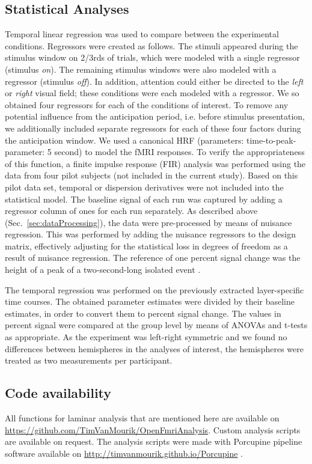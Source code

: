 \subsection{Statistical Analyses}
Temporal linear regression was used to compare between the experimental conditions. Regressors were created as follows. The stimuli appeared during the stimulus window on 2/3rds of trials, which were modeled with a single regressor (stimulus \emph{on}). The remaining stimulus windows were also modeled with a regressor (stimulus \emph{off}). In addition, attention could either be directed to the \emph{left} or \emph{right} visual field; these conditions were each modeled with a regressor. We so obtained four regressors for each of the conditions of interest. To remove any potential influence from the anticipation period, i.e. before stimulus presentation, we additionally included separate regressors for each of these four factors during the anticipation window. We used a canonical HRF (parameters: time-to-peak-parameter: 5 second) to model the fMRI responses. To verify the appropriateness of this function, a finite impulse response (FIR) analysis \cite{Josephs1997} was performed using the data from four pilot subjects (not included in the current study). Based on this pilot data set, temporal or dispersion derivatives were not included into the statistical model. The baseline signal of each run was captured by adding a regressor column of ones for each run separately. As described above (Sec.~\ref{sec:dataProcessing}), the data were pre-processed by means of nuisance regression. This was performed by adding the nuisance regressors to the design matrix, effectively adjusting for the statistical loss in degrees of freedom as a result of nuisance regression. The reference of one percent signal change was the height of a peak of a two-second-long isolated event \cite{Mumford2007}.

The temporal regression was performed on the previously extracted layer-specific time courses. The obtained parameter estimates were divided by their baseline estimates, in order to convert them to percent signal change. The values in percent signal were compared at the group level by means of ANOVAs and t-tests as appropriate. As the experiment was left-right symmetric and we found no differences between hemispheres in the analyses of interest, the hemispheres were treated as two measurements per participant.

\subsection{Code availability}
All functions for laminar analysis that are mentioned here are available on \url{https://github.com/TimVanMourik/OpenFmriAnalysis}. Custom analysis scripts are available on request. The analysis scripts were made with Porcupine pipeline software available on \url{http://timvanmourik.github.io/Porcupine} \cite{VanMourik2017}.


